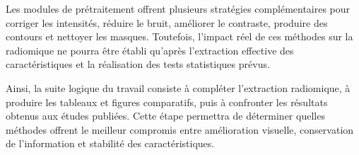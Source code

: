 Les modules de prétraitement offrent plusieurs stratégies complémentaires pour corriger les intensités, réduire le bruit, améliorer le contraste, produire des contours et nettoyer les masques. Toutefois, l'impact réel de ces méthodes sur la radiomique ne pourra être établi qu'après l'extraction effective des caractéristiques et la réalisation des tests statistiques prévus.

Ainsi, la suite logique du travail consiste à compléter l'extraction radiomique, à produire les tableaux et figures comparatifs, puis à confronter les résultats obtenus aux études publiées. Cette étape permettra de déterminer quelles méthodes offrent le meilleur compromis entre amélioration visuelle, conservation de l'information et stabilité des caractéristiques.
